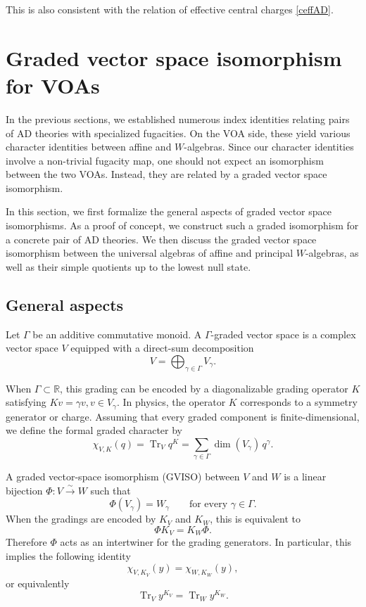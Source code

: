 \documentclass[a4paper,11pt]{article}
\theoremstyle{definition}
\theoremstyle{definition}
\theoremstyle{remark}
\newcommand{\be}{\begin{equation}}
\newcommand{\ee}{\end{equation}}
\begin{document}
This is also consistent with the relation of effective central charges \eqref{ceffAD}. 

 \section{Graded vector space isomorphism for VOAs}\label{GVISOsec}

In the previous sections, we established numerous index identities relating pairs of AD theories with specialized fugacities. On the VOA side, these yield various character identities between affine and  $W$-algebras. Since our character identities involve a non-trivial fugacity map, one should not expect an isomorphism between the two VOAs. Instead, they are related by a graded vector space isomorphism. 

In this section, we first formalize the general aspects of graded vector space isomorphisms. As a proof of concept, we construct such a graded isomorphism for a concrete pair of AD theories. We then discuss the graded vector space isomorphism between the universal algebras of affine and principal  $W$-algebras, as well as their simple quotients up to the lowest null state.
 
\subsection{General aspects}

Let $\Gamma$ be an additive commutative monoid. A
$\Gamma$-graded vector space is a complex vector space $V$
equipped with a direct-sum decomposition
\begin{equation}
    V=\bigoplus_{\gamma\in\Gamma}V_\gamma.
\end{equation}
 

When $\Gamma\subset\mathbb R$, this grading can be encoded by
a diagonalizable grading operator $K$ satisfying
$     Kv=\gamma v,  v\in V_\gamma $. 
In physics, the operator $K$ corresponds to a symmetry  generator or charge.
Assuming that every graded component is finite-dimensional,
we define the formal graded character by
\begin{equation}
    \chi_{V,K}(q)
    =\operatorname{Tr}_V q^K
    =\sum_{\gamma\in\Gamma}
      \dim(V_\gamma)\,q^\gamma.
\end{equation}

A graded vector-space isomorphism (GVISO) between $V$ and $W$ is
a linear bijection $\Phi:V\xrightarrow{\sim}  W$ such that
\begin{equation}
    \Phi(V_\gamma)=W_\gamma
    \qquad\text{for every }\gamma\in\Gamma.
\end{equation}
When the gradings are encoded by $K_V$ and $K_W$, this is
equivalent to
\begin{equation}\label{PhiKVW}
    \Phi K_V=K_W\Phi.
\end{equation}
Therefore $\Phi$  acts as an intertwiner for the grading generators.
In particular, this implies the following identity  
\be\label{VWKs}
\chi_{V,K_V {   }}(  y)=\chi_{W,K _W{   }}(  y),
\ee
 or equivalently 
 \be
\operatorname{Tr}_{V}  y^{  K_V}
=\operatorname{Tr}_{W}  y^{  K_W}.
\ee
\end{document}
